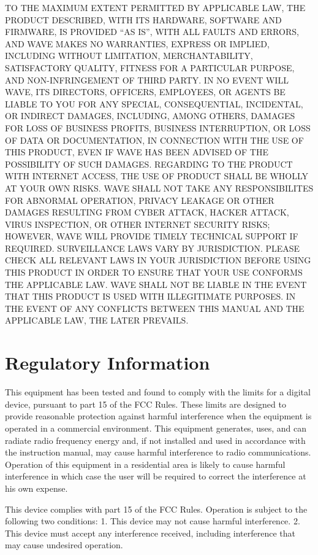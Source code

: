 \documentclass[letterpaper,10pt,english]{sphinxmanual}
\begin{document}
TO THE MAXIMUM EXTENT PERMITTED BY APPLICABLE LAW, THE PRODUCT DESCRIBED, WITH ITS HARDWARE, SOFTWARE AND FIRMWARE, IS PROVIDED “AS IS”, WITH ALL FAULTS AND ERRORS, AND WAVE MAKES NO WARRANTIES, EXPRESS OR IMPLIED, INCLUDING WITHOUT LIMITATION, MERCHANTABILITY, SATISFACTORY QUALITY, FITNESS FOR A PARTICULAR PURPOSE, AND NON-INFRINGEMENT OF THIRD PARTY. IN NO EVENT WILL WAVE, ITS DIRECTORS, OFFICERS, EMPLOYEES, OR AGENTS BE LIABLE TO YOU FOR ANY SPECIAL, CONSEQUENTIAL, INCIDENTAL, OR INDIRECT DAMAGES, INCLUDING, AMONG OTHERS, DAMAGES FOR LOSS OF BUSINESS PROFITS, BUSINESS INTERRUPTION, OR LOSS OF DATA OR DOCUMENTATION, IN CONNECTION WITH THE USE OF THIS PRODUCT, EVEN IF WAVE HAS BEEN ADVISED OF THE POSSIBILITY OF SUCH DAMAGES.
REGARDING TO THE PRODUCT WITH INTERNET ACCESS, THE USE OF PRODUCT SHALL BE WHOLLY AT YOUR OWN RISKS. WAVE SHALL NOT TAKE ANY RESPONSIBILITES FOR ABNORMAL OPERATION, PRIVACY LEAKAGE OR OTHER DAMAGES RESULTING FROM CYBER ATTACK, HACKER ATTACK, VIRUS INSPECTION, OR OTHER INTERNET SECURITY RISKS; HOWEVER, WAVE WILL PROVIDE TIMELY TECHNICAL SUPPORT IF REQUIRED.
SURVEILLANCE LAWS VARY BY JURISDICTION. PLEASE CHECK ALL RELEVANT LAWS IN YOUR JURISDICTION BEFORE USING THIS PRODUCT IN ORDER TO ENSURE THAT YOUR USE CONFORMS THE APPLICABLE LAW. WAVE SHALL NOT BE LIABLE IN THE EVENT THAT THIS PRODUCT IS USED WITH ILLEGITIMATE PURPOSES.
IN THE EVENT OF ANY CONFLICTS BETWEEN THIS MANUAL AND THE APPLICABLE LAW, THE LATER PREVAILS.


\section{Regulatory Information}
\label{\detokenize{legalandsafety:regulatory-information}}

 This equipment has been tested and found to comply with the limits for a digital device, pursuant to part 15 of the FCC Rules. These limits are designed to provide reasonable protection against harmful interference when the equipment is operated in a commercial environment. This equipment generates, uses, and can radiate radio frequency energy and, if not installed and used in accordance with the instruction manual, may cause harmful interference to radio communications. Operation of this equipment in a residential area is likely to cause harmful interference in which case the user will be required to correct the interference at his own expense.

This device complies with part 15 of the FCC Rules. Operation is subject to the following two conditions: 1. This device may not cause harmful interference. 2. This device must accept any interference received, including interference that may cause undesired operation.
\end{document}
